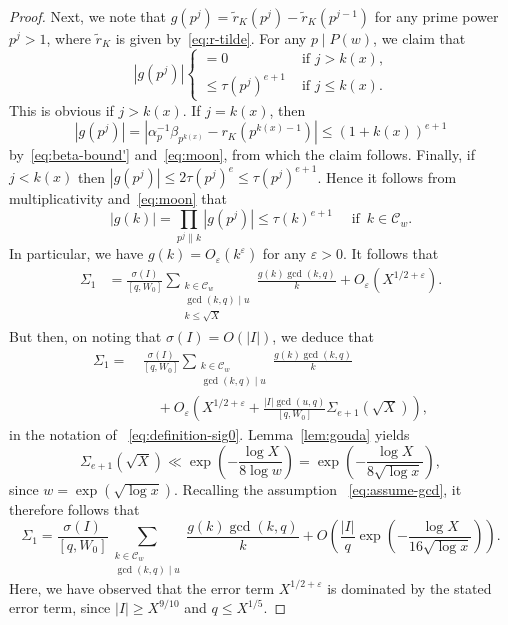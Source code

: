 \documentclass[11pt,letterpaper]{amsart}
\renewcommand{\leq}{\leqslant}
\renewcommand{\geq}{\geqslant}
\theoremstyle{definition}
\numberwithin{equation}{section}
\newcommand{\ve}{\varepsilon}
\newcommand{\0}{\mathbf{0}}
\begin{document}
\begin{proof}
Next, we note that  $g(p^j)=\tilde r_K(p^j)-\tilde r_K(p^{j-1})$ for any prime power $p^j>1$,
where $\tilde r_K$ is given by~\eqref{eq:r-tilde}. For any  $p\mid P(w)$, we  claim that 
\begin{equation}\label{eq:nature-g}
|g(p^j)|
\begin{cases}
=0 &\text{ if $j>k(x)$,}\\
\leq  \tau(p^j)^{e+1} &\text{ if $j\leq k(x)$.}
\end{cases}
\end{equation}
This is obvious if $j>k(x)$. 
If $j=k(x)$,  then 
$$
|g(p^j)|=|\alpha_p^{-1}\beta_{p^{k(x)}}-r_K(p^{k(x)-1})|\leq (1+k(x))^{e+1}
$$
by~\eqref{eq:beta-bound'} and~\eqref{eq:moon}, from which the claim follows.  Finally, if $j<k(x)$ then 
$|g(p^j)| \leq 
2\tau(p^j)^e \leq \tau(p^j)^{e+1}$.
Hence it follows from multiplicativity and~\eqref{eq:moon} that  
\begin{equation}\label{eq:size-g}
|g(k)|=\prod_{p^j\| k} |g(p^j)| \leq 
 \tau(k)^{e+1} \quad \text{ if }\, k\in \mathcal{C}_w.
\end{equation}
In particular, we have  $g(k)=O_\ve(k^\ve)$ for any $\ve>0$.
It follows that 
 \begin{align*}
 \Sigma_1
&= \frac{\sigma(I)}{[q,W_0]}
\sum_{\substack{k\in \mathcal{C}_w\\ \gcd(k,q)\mid u\\ k\leq \sqrt{X}}} \frac{g(k)\gcd(k,q) }{k}
+O_\ve(X^{1/2+\ve}).
\end{align*}
But then, on noting that $\sigma(I)=O(|I|)$,  we deduce  that 
 \begin{align*}
 \Sigma_1
=~& \frac{\sigma(I)}{[q,W_0]} 
\sum_{\substack{k\in \mathcal{C}_w\\ \gcd(k,q)\mid u}} \frac{g(k)\gcd(k,q) }{k}\\
&\quad 
+O_\ve\left(X^{1/2+\ve} +\frac{|I|\gcd(u,q)}{[q,W_0]}\Sigma_{e+1}(\sqrt{X})\right),
\end{align*}
in the notation of ~\eqref{eq:definition-sig0}. Lemma~\ref{lem:gouda} yields
$$
\Sigma_{e+1}(\sqrt{X})
\ll \exp\left(-\frac{\log X}{8\log w} \right)=\exp\left(-\frac{\log X}{8\sqrt{\log x}} \right),
$$
since  $w=\exp(\sqrt{\log x})$. 
Recalling the assumption ~\eqref{eq:assume-gcd}, 
it  therefore follows that 
$$
\Sigma_1=
\frac{\sigma(I)}{[q,W_0]} 
\sum_{\substack{k\in \mathcal{C}_w\\ \gcd(k,q)\mid u}} \frac{g(k)\gcd(k,q) }{k}
+
O\left(\frac{|I|}{q}
\exp\left(-\frac{\log X}{16\sqrt{\log x}} \right)\right).
$$
Here, we have observed that the error term $X^{1/2+\ve}$ is dominated by the stated  error term, since 
$|I|\geq X^{9/10}$ and 
$q\leq X^{1/5}$.



\end{proof}
\end{document}
